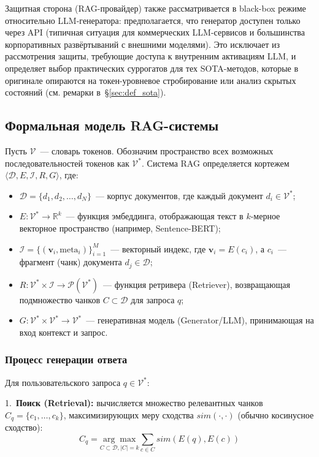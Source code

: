 \documentclass[12pt, a4paper]{article}
\theoremstyle{definition}
\theoremstyle{remark}
\begin{document}
Защитная сторона (RAG-провайдер) также рассматривается в black-box режиме относительно LLM-генератора: предполагается, что генератор доступен только через API (типичная ситуация для коммерческих LLM-сервисов и большинства корпоративных развёртываний с внешними моделями). Это исключает из рассмотрения защиты, требующие доступа к внутренним активациям LLM, и определяет выбор практических суррогатов для тех SOTA-методов, которые в оригинале опираются на токен-уровневое стробирование или анализ скрытых состояний (см. ремарки в~\S\ref{sec:def_sota}).

\subsection{Формальная модель RAG-системы}
\label{sec:math_rag_model}

Пусть $\mathcal{V}$~--- словарь токенов. Обозначим пространство всех возможных последовательностей токенов как $\mathcal{V}^*$. Система RAG определяется кортежем $\langle \mathcal{D}, E, \mathcal{I}, R, G \rangle$, где:
\begin{itemize}
    \item $\mathcal{D} = \{d_1, d_2, \dots, d_N\}$~--- корпус документов, где каждый документ $d_i \in \mathcal{V}^*$;
    \item $E: \mathcal{V}^* \to \mathbb{R}^k$~--- функция эмбеддинга, отображающая текст в $k$-мерное векторное пространство (например, Sentence-BERT);
    \item $\mathcal{I} = \{ (\mathbf{v}_i, \text{meta}_i) \}_{i=1}^M$~--- векторный индекс, где $\mathbf{v}_i = E(c_i)$, а $c_i$~--- фрагмент (чанк) документа $d_j \in \mathcal{D}$;
    \item $R: \mathcal{V}^* \times \mathcal{I} \to \mathcal{P}(\mathcal{V}^*)$~--- функция ретривера (Retriever), возвращающая подмножество чанков $C \subset \mathcal{D}$ для запроса $q$;
    \item $G: \mathcal{V}^* \times \mathcal{V}^* \to \mathcal{V}^*$~--- генеративная модель (Generator/LLM), принимающая на вход контекст и запрос.
\end{itemize}

\subsubsection{Процесс генерации ответа}
Для пользовательского запроса $q \in \mathcal{V}^*$:

1.~\textbf{Поиск (Retrieval):} вычисляется множество релевантных чанков $C_q = \{c_1, \dots, c_k\}$, максимизирующих меру сходства $sim(\cdot, \cdot)$ (обычно косинусное сходство):
    \begin{equation}
        C_q = \underset{C \subset \mathcal{D}, |C|=k}{\arg\max} \sum_{c \in C} sim(E(q), E(c))
    \end{equation}
\end{document}
